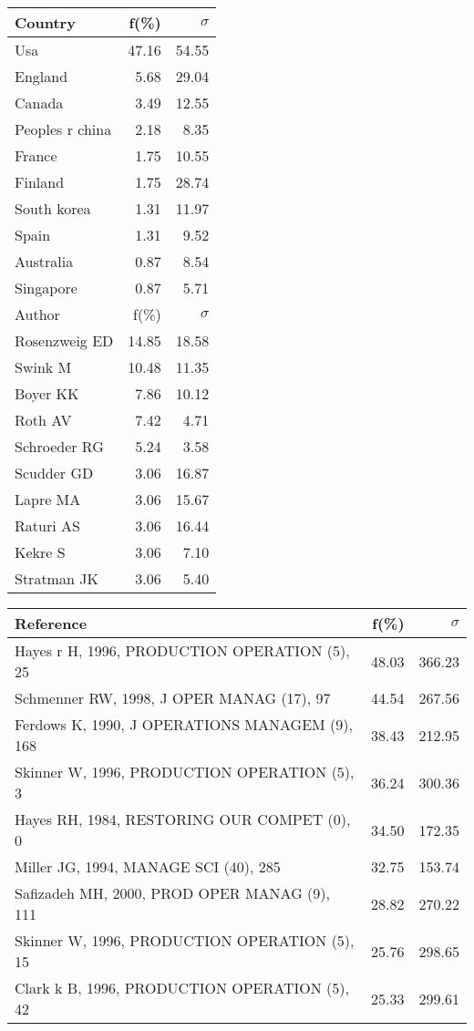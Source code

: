 \documentclass[a4paper,11pt]{report}
\begin{document}
\begin{landscape}
\begin{table}[!ht]
{\begin{tabular}{|l r r|}
\hline
\hline
Country & f(\%) & $\sigma$\\
\hline
Usa & 47.16 & 54.55\\
England & 5.68 & 29.04\\
Canada & 3.49 & 12.55\\
Peoples r china & 2.18 & 8.35\\
France & 1.75 & 10.55\\
Finland & 1.75 & 28.74\\
South korea & 1.31 & 11.97\\
Spain & 1.31 & 9.52\\
Australia & 0.87 & 8.54\\
Singapore & 0.87 & 5.71\\
\hline
\hline
Author & f(\%) & $\sigma$\\
\hline
Rosenzweig ED & 14.85 & 18.58\\
Swink M & 10.48 & 11.35\\
Boyer KK & 7.86 & 10.12\\
Roth AV & 7.42 & 4.71\\
Schroeder RG & 5.24 & 3.58\\
Scudder GD & 3.06 & 16.87\\
Lapre MA & 3.06 & 15.67\\
Raturi AS & 3.06 & 16.44\\
Kekre S & 3.06 & 7.10\\
Stratman JK & 3.06 & 5.40\\
\hline
\end{tabular}
}
{\scriptsize\begin{tabular}{|l r r|}
\hline
Reference & f(\%) & $\sigma$\\
\hline
Hayes r H, 1996, PRODUCTION OPERATION (5), 25 & 48.03 & 366.23\\
Schmenner RW, 1998, J OPER MANAG (17), 97 & 44.54 & 267.56\\
Ferdows K, 1990, J OPERATIONS MANAGEM (9), 168 & 38.43 & 212.95\\
Skinner W, 1996, PRODUCTION OPERATION (5), 3 & 36.24 & 300.36\\
Hayes RH, 1984, RESTORING OUR COMPET (0), 0 & 34.50 & 172.35\\
Miller JG, 1994, MANAGE SCI (40), 285 & 32.75 & 153.74\\
Safizadeh MH, 2000, PROD OPER MANAG (9), 111 & 28.82 & 270.22\\
Skinner W, 1996, PRODUCTION OPERATION (5), 15 & 25.76 & 298.65\\
Clark k B, 1996, PRODUCTION OPERATION (5), 42 & 25.33 & 299.61\\

\end{tabular}}
\end{table}
\end{landscape}
\end{document}
